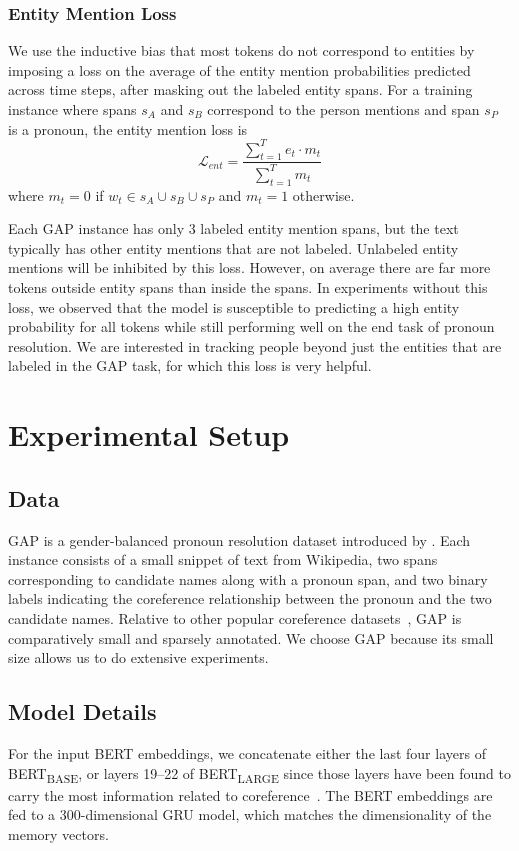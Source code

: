 \documentclass[12pt]{thesis-umich}[thesis]
\newcommand{\bertbase}{BERT\textsubscript{BASE}\xspace}
\newcommand{\bertlarge}{BERT\textsubscript{LARGE}\xspace}
\begin{document}
\subsubsection{Entity Mention Loss}
\label{sec:ent_pred_loss}
We use the inductive bias that most tokens do not correspond to entities by imposing a loss on the average of the entity mention probabilities predicted across time steps, after masking out the labeled entity spans. 
For a training instance where spans $s_A$ and $s_B$ correspond to the person mentions and span $s_P$ is a pronoun, the entity mention loss is \vspace{-0.05in}
$$\mathcal{L}_{\mathit{ent}} = \frac{\sum_{t=1}^T e_t \cdot m_t}{\sum_{t=1}^T m_t}$$ 
where $m_t = 0$ if $w_t \in s_A \cup s_B \cup s_P$ and $m_t = 1$ otherwise. 

Each GAP instance has only 3 labeled entity mention spans, but the text typically has other entity mentions that are not labeled. 
Unlabeled entity mentions will be 
inhibited by this loss. However, on average there are far more tokens outside entity spans than inside the spans. 
In experiments without this loss, we observed that the model is susceptible to 
predicting a high entity probability for all tokens while still performing well on the end task of pronoun resolution. We are interested in tracking people beyond just the entities that are labeled in the GAP task, 
for which this loss is very helpful. 


\section{Experimental Setup}
\subsection{Data}
GAP is a gender-balanced pronoun resolution dataset
introduced by \citet{webster2018gap}.
Each instance consists of a small snippet of text from Wikipedia, two spans corresponding to candidate names along with a pronoun span, and two binary labels indicating the coreference relationship between the pronoun and the two candidate names. Relative to other popular coreference datasets~\cite{weischedel2013ontonotes, chen-etal-2018-preco},
GAP is comparatively small and sparsely annotated. We choose GAP because its small size allows us to do extensive experiments.






\subsection{Model Details}
For the input BERT embeddings, we concatenate either the last four layers of \bertbase, or layers 19--22 of \bertlarge since those layers have been found to carry the most information related to coreference~\cite{liu2019linguistic}. The BERT embeddings are fed to a 300-dimensional GRU model, which matches the dimensionality of the memory vectors.
\end{document}
